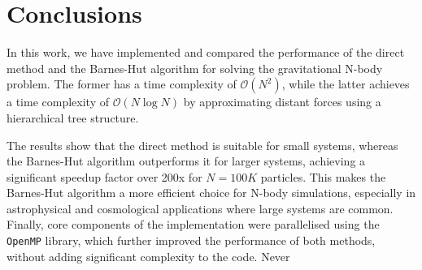 \documentclass[runningheads]{llncs}
\begin{document}
\section{Conclusions}

In this work, we have implemented and compared the performance of the direct method and the Barnes-Hut algorithm for solving the gravitational N-body problem. The former has a time complexity of $\mathcal{O}(N^2)$, while the latter achieves a time complexity of $\mathcal{O}(N\log N)$ by approximating distant forces using a hierarchical tree structure.

The results show that the direct method is suitable for small systems, whereas the Barnes-Hut algorithm outperforms it for larger systems, achieving a significant speedup factor over 200x for $N=100K$ particles. This makes the Barnes-Hut algorithm a more efficient choice for N-body simulations, especially in astrophysical and cosmological applications where large systems are common.
Finally, core components of the implementation were parallelised using the \texttt{OpenMP} library, which further improved the performance of both methods, without adding significant complexity to the code. Never


%
%
%


%
\end{document}

